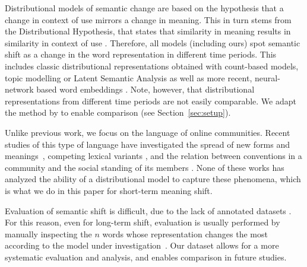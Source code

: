 Distributional models of semantic change are based on the hypothesis
that a change in context of use mirrors a change in meaning.
This in turn stems from the Distributional Hypothesis, that states
that similarity in meaning results in similarity in context of use \cite{harris1954distributional}.
Therefore, all models (including ours) spot semantic shift as a change in the word representation in different time periods.
This includes classic distributional representations obtained with count-based models, topic
modelling or Latent Semantic Analysis
\cite{sagi2011tracing,jatowt2014framework,wijaya2011understanding,gulordava2011distributional}
as well as more recent, neural-network based word embeddings
\cite{kim2014temporal,kulkarni2015statistically,hamilton2016diachronic,azarbonyad2017words,szymanski2017temporal,yao2018dynamic}.
Note, however, that distributional representations from different time periods 
are not easily comparable.
We adapt the method by  to enable comparison
(see Section~\ref{sec:setup}).

Unlike previous work, we focus on the language of online communities.
Recent studies of this type of language have investigated the spread of new forms and meanings~\cite{del2017semantic,del2018road,stewart2018making}, 
competing lexical variants \cite{rotabi2017competition}, and the relation between conventions in a community and 
the social standing of its members \cite{danescu2013no}. 
None of these works has analyzed the ability of a distributional model to capture these phenomena, 
which is what we do in this paper for short-term meaning shift. 

Evaluation of semantic shift is difficult, due to the lack of
annotated datasets \cite{frermann2016bayesian}. For this reason, even for long-term shift, evaluation is usually performed by manually
inspecting the $n$ words whose representation changes the most
according to the model under investigation~\cite{hamilton2016diachronic,kim2014temporal}.
Our dataset allows for a more systematic evaluation and analysis, and
enables comparison in future studies.

